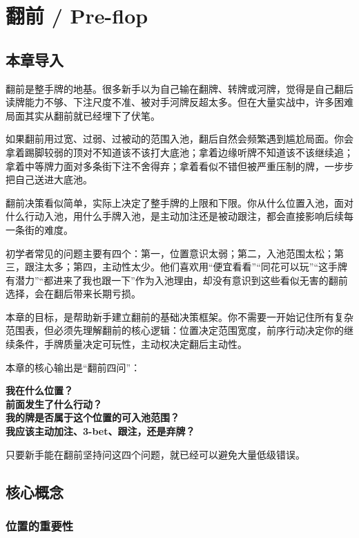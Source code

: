 \chapter{翻前 / Pre-flop}

\section{本章导入}

翻前是整手牌的地基。很多新手以为自己输在翻牌、转牌或河牌，觉得是自己翻后读牌能力不够、下注尺度不准、被对手河牌反超太多。但在大量实战中，许多困难局面其实从翻前就已经埋下了伏笔。

如果翻前用过宽、过弱、过被动的范围入池，翻后自然会频繁遇到尴尬局面。你会拿着踢脚较弱的顶对不知道该不该打大底池；拿着边缘听牌不知道该不该继续追；拿着中等牌力面对多条街下注不舍得弃；拿着看似不错但被严重压制的牌，一步步把自己送进大底池。

翻前决策看似简单，实际上决定了整手牌的上限和下限。你从什么位置入池，面对什么行动入池，用什么手牌入池，是主动加注还是被动跟注，都会直接影响后续每一条街的难度。

初学者常见的问题主要有四个：第一，位置意识太弱；第二，入池范围太松；第三，跟注太多；第四，主动性太少。他们喜欢用“便宜看看”“同花可以玩”“这手牌有潜力”“都进来了我也跟一下”作为入池理由，却没有意识到这些看似无害的翻前选择，会在翻后带来长期亏损。

本章的目标，是帮助新手建立翻前的基础决策框架。你不需要一开始记住所有复杂范围表，但必须先理解翻前的核心逻辑：位置决定范围宽度，前序行动决定你的继续条件，手牌质量决定可玩性，主动权决定翻后主动性。

本章的核心输出是“翻前四问”：

\begin{center}
\textbf{我在什么位置？\\
前面发生了什么行动？\\
我的牌是否属于这个位置的可入池范围？\\
我应该主动加注、3-bet、跟注，还是弃牌？}
\end{center}

只要新手能在翻前坚持问这四个问题，就已经可以避免大量低级错误。

\section{核心概念}

\subsection{位置的重要性}

